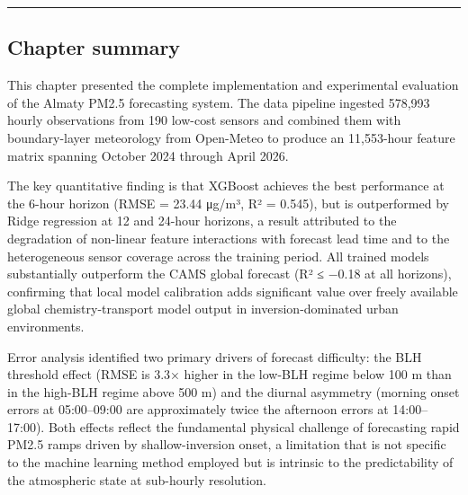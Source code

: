 \begin{center}\rule{0.5\linewidth}{0.5pt}\end{center}

\subsection{Chapter summary}\label{chapter-summary}

This chapter presented the complete implementation and experimental evaluation of the Almaty PM2.5 forecasting system. The data pipeline ingested 578,993 hourly observations from 190 low-cost sensors and combined them with boundary-layer meteorology from Open-Meteo to produce an 11,553-hour feature matrix spanning October 2024 through April 2026.

The key quantitative finding is that XGBoost achieves the best performance at the 6-hour horizon (RMSE = 23.44 μg/m³, R² = 0.545), but is outperformed by Ridge regression at 12 and 24-hour horizons, a result attributed to the degradation of non-linear feature interactions with forecast lead time and to the heterogeneous sensor coverage across the training period. All trained models substantially outperform the CAMS global forecast (R² ≤ −0.18 at all horizons), confirming that local model calibration adds significant value over freely available global chemistry-transport model output in inversion-dominated urban environments.

Error analysis identified two primary drivers of forecast difficulty: the BLH threshold effect (RMSE is 3.3× higher in the low-BLH regime below 100 m than in the high-BLH regime above 500 m) and the diurnal asymmetry (morning onset errors at 05:00--09:00 are approximately twice the afternoon errors at 14:00--17:00). Both effects reflect the fundamental physical challenge of forecasting rapid PM2.5 ramps driven by shallow-inversion onset, a limitation that is not specific to the machine learning method employed but is intrinsic to the predictability of the atmospheric state at sub-hourly resolution.

